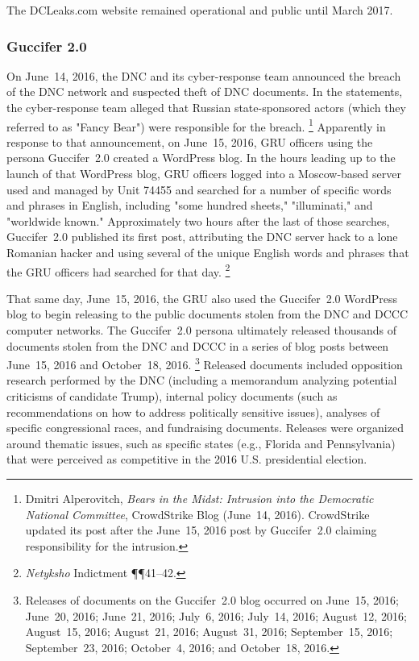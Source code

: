 The DCLeaks.com website remained operational and public until March 2017.

\subsubsection{Guccifer 2.0}

On June~14, 2016, the DNC and its cyber-response team announced the breach of the DNC network and suspected theft of DNC documents.
In the statements, the cyber-response team alleged that Russian state-sponsored actors (which they referred to as "Fancy Bear") were responsible for the breach.%
\footnote{Dmitri Alperovitch, \textit{Bears in the Midst: Intrusion into the Democratic National Committee}, CrowdStrike Blog (June~14, 2016).
CrowdStrike updated its post after the June~15, 2016 post by Guccifer~2.0 claiming responsibility for the intrusion.}
Apparently in response to that announcement, on June~15, 2016, GRU officers using the persona Guccifer~2.0 created a WordPress blog.
In the hours leading up to the launch of that WordPress blog, GRU officers logged into a Moscow-based server used and managed by Unit 74455 and searched for a number of specific words and phrases in English, including "some hundred sheets," "illuminati," and "worldwide known."
Approximately two hours after the last of those searches, Guccifer~2.0 published its first post, attributing the DNC server hack to a lone Romanian hacker and using several of the unique English words and phrases that the GRU officers had searched for that day.%
\footnote{\textit{Netyksho} Indictment \P\P 41--42.}

That same day, June~15, 2016, the GRU also used the Guccifer~2.0 WordPress blog to begin releasing to the public documents stolen from the DNC and DCCC computer networks.
The Guccifer~2.0 persona ultimately released thousands of documents stolen from the DNC and DCCC in a series of blog posts between June~15, 2016 and October~18, 2016.%
\footnote{Releases of documents on the Guccifer~2.0 blog occurred on June~15, 2016;
June~20, 2016;
June~21, 2016;
July~6, 2016;
July~14, 2016;
August~12, 2016;
August~15, 2016;
August~21, 2016;
August~31, 2016;
September~15, 2016;
September~23, 2016;
October~4, 2016;
and October~18, 2016.}
Released documents included opposition research performed by the DNC (including a memorandum analyzing potential criticisms of candidate Trump), internal policy documents (such as recommendations on how to address politically sensitive issues), analyses of specific congressional races, and fundraising documents.
Releases were organized around thematic issues, such as specific states (e.g., Florida and Pennsylvania) that were perceived as competitive in the 2016 U.S. presidential election.

